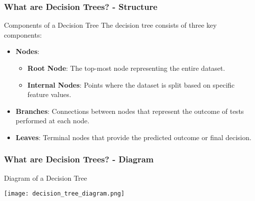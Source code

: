 \documentclass[aspectratio=169]{beamer}
\begin{document}
\begin{frame}[fragile]
    \frametitle{What are Decision Trees? - Structure}
    \begin{block}{Components of a Decision Tree}
        The decision tree consists of three key components:
        \begin{itemize}
            \item \textbf{Nodes}:
            \begin{itemize}
                \item \textbf{Root Node}: The top-most node representing the entire dataset.
                \item \textbf{Internal Nodes}: Points where the dataset is split based on specific feature values.
            \end{itemize}
            
            \item \textbf{Branches}: Connections between nodes that represent the outcome of tests performed at each node.
            
            \item \textbf{Leaves}: Terminal nodes that provide the predicted outcome or final decision.
        \end{itemize}
    \end{block}
\end{frame}

\begin{frame}[fragile]
    \frametitle{What are Decision Trees? - Diagram}
    \begin{block}{Diagram of a Decision Tree}
        \begin{center}
            \texttt{[image: decision\_tree\_diagram.png]} %
        \end{center}
    \end{block}
\end{frame}
\end{document}
